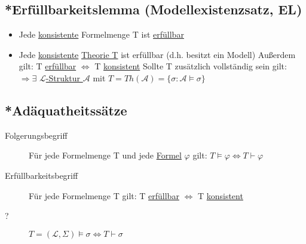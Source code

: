 \documentclass[12pt,a4paper]{article} %
\begin{document}
	\subsection{*Erfüllbarkeitslemma (Modellexistenzsatz, EL)}
	\begin{itemize}
		\item Jede \hyperref[ALKonsistent]{konsistente} Formelmenge T ist \hyperref[Erfullbar]{erfüllbar}
		\item Jede \hyperref[PLKonsistent]{konsistente} \hyperref[Theorie]{Theorie T} ist erfüllbar (d.h. besitzt ein Modell) \newline
		Außerdem gilt: T \hyperref[Erfullbar]{erfüllbar} $\Leftrightarrow$ T \hyperref[PLKonsistent]{konsistent} \newline
		Sollte T zusätzlich vollständig sein gilt: $\Rightarrow \exists$ \hyperref[Struktur]{$\mathcal{L}$-Struktur $\mathcal{A}$} mit $T = Th(\mathcal{A}) = \{\sigma : \mathcal{A} \hyperref[Erfullbar]{\vDash} \sigma\}$
	\end{itemize}
	
	\subsection{*Adäquatheitssätze}
	\begin{description}
		\item[Folgerungsbegriff] Für jede Formelmenge T und jede \hyperref[Formel]{Formel} $\varphi$ gilt: $T \hyperref[Erfullbar]{\vDash} \varphi \Leftrightarrow T \hyperref[Beweisbar]{\vdash} \varphi$
		\item[Erfüllbarkeitsbegriff] Für jede Formelmenge T gilt: T \hyperref[Erfullbar]{erfüllbar} $\Leftrightarrow$ T \hyperref[ALKonsistent]{konsistent}
		\item[?] $T = (\mathcal{L}, \Sigma) \hyperref[Erfullbar]{\vDash} \sigma \Leftrightarrow T \hyperref[Beweisbar]{\vdash} \sigma$
	\end{description} 
	
\end{document}
